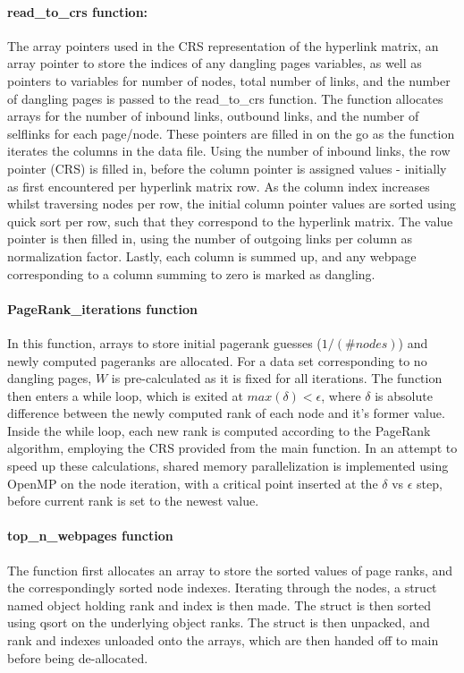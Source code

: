 \documentclass[%
oneside,                 %
final,                   %
10pt]{article}
\begin{document}
\paragraph{read\_to\_crs function: } The array pointers used in the CRS representation of the hyperlink matrix, an array pointer to store the indices of any dangling pages variables, as well as pointers to variables for number of nodes, total number of links, and the number of dangling pages is passed to the read\_to\_crs function. The function allocates arrays for the number of inbound links, outbound links, and the number of selflinks for each page/node. These pointers are filled in on the go as the function iterates the columns in the data file. Using the number of inbound links, the row pointer (CRS) is filled in, before the column pointer is assigned values - initially as first encountered per hyperlink matrix row. As the column index increases whilst traversing nodes per row, the initial column pointer values are sorted using quick sort per row, such that they correspond to the hyperlink matrix. The value pointer is then filled in, using the number of outgoing links per column as normalization factor. Lastly, each column is summed up, and any webpage corresponding to a column summing to zero is marked as dangling.

\paragraph{PageRank\_iterations function}
In this function, arrays to store initial pagerank guesses ($1/(\#nodes)$) and newly computed pageranks are allocated. For a data set corresponding to no dangling pages, $W$ is pre-calculated as it is fixed for all iterations. The function then enters a while loop, which is exited at $max(\delta)<\epsilon$, where $\delta$ is absolute difference between the newly computed rank of each node and it's former value. Inside the while loop, each new rank is computed according to the PageRank algorithm, employing the CRS provided from the main function. In an attempt to speed up these calculations, shared memory parallelization is implemented using OpenMP on the node iteration, with a critical point inserted at the $\delta$ vs $\epsilon$ step, before current rank is set to the newest value.

\paragraph{top\_n\_webpages function}
The function first allocates an array to store the sorted values of page ranks, and the correspondingly sorted node indexes. Iterating through the nodes, a struct named object holding rank and index is then made. The struct is then sorted using qsort on the underlying object ranks. The struct is then unpacked, and rank and indexes unloaded onto the arrays, which are then handed off to main before being de-allocated. 
\end{document}
